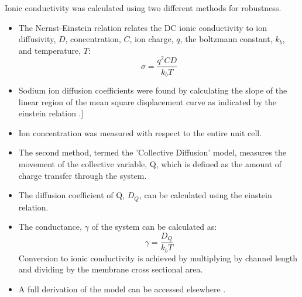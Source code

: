 \documentclass{article}
\begin{document}
  Ionic conductivity was calculated using two different methods for
  robustness.
  \begin{itemize}
    \item The Nernst-Einstein relation relates the DC ionic conductivity to 
    ion diffusivity, $D$, concentration, $C$, ion charge, $q$, the boltzmann 
    constant, $k_b$, and temperature, $T$: $$\sigma = \dfrac{q^2CD}{k_b T}$$  %
    \item Sodium ion diffusion coefficients were found by calculating the slope
    of the linear region of the mean square displacement curve as indicated by
    the einstein relation \cite{einstein_investigations_1956}.]
    \item Ion concentration was measured with respect to the entire unit cell. %
    \item The second method, termed the 'Collective Diffusion' model, measures 
    the movement of the collective variable, Q, which is defined as the amount
    of charge transfer through the system.
    \item The diffusion coefficient of Q, $D_Q$, can be calculated using the 
    einstein relation.
    \item The conductance, $\gamma$ of the system can be calculated as:
    $$ \gamma = \dfrac{D_Q}{k_b T} $$ Conversion to ionic conductivity is
    achieved by multiplying by channel length and dividing by the membrane
    cross sectional area.
    \item A full derivation of the model can be accessed elsewhere \cite{liu_collective_2013}.
  \end{itemize}
    
\end{document}

